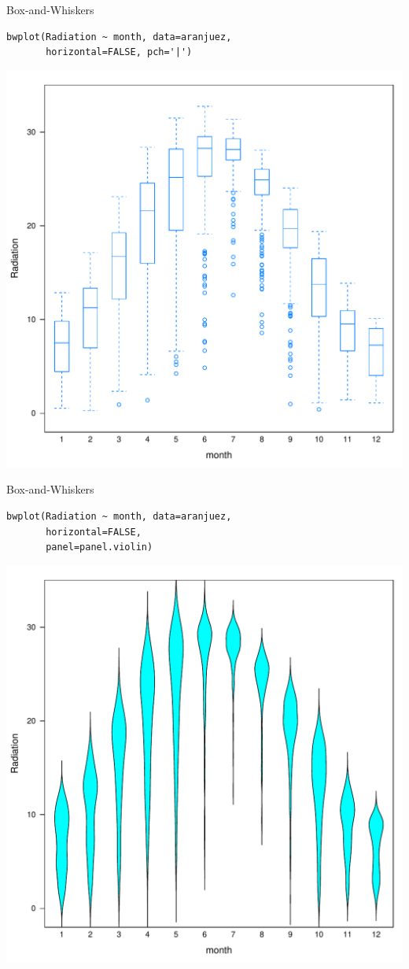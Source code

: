 \documentclass[xcolor={usenames,svgnames,dvipsnames}]{beamer}
\begin{document}
\begin{frame}[fragile,label=sec-2-1-20]{Box-and-Whiskers}
 \lstset{language=R,numbers=none}
\begin{lstlisting}
bwplot(Radiation ~ month, data=aranjuez,
       horizontal=FALSE, pch='|')
\end{lstlisting}

\includegraphics[width=.9\linewidth]{figs/bwplot.pdf}
\end{frame}
\begin{frame}[fragile,label=sec-2-1-21]{Box-and-Whiskers}
 \lstset{language=R,numbers=none}
\begin{lstlisting}
bwplot(Radiation ~ month, data=aranjuez,
       horizontal=FALSE,
       panel=panel.violin)
\end{lstlisting}

\includegraphics[width=.9\linewidth]{figs/violin.pdf}
\end{frame}
\end{document}
